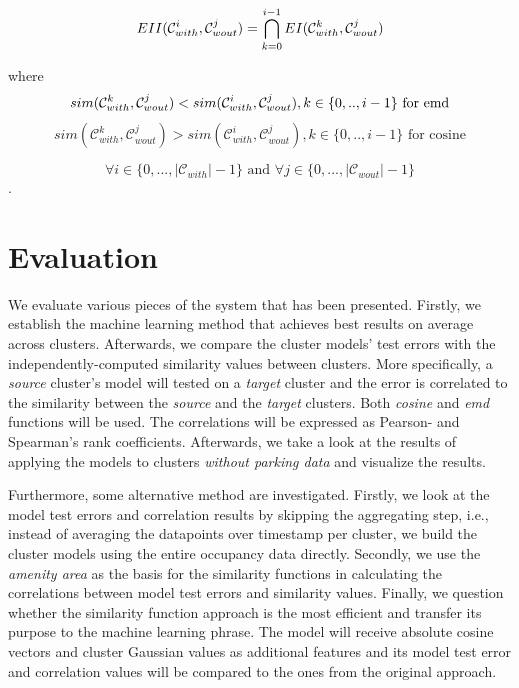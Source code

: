 	\begin{equation}
	EII(\mathcal{C}_{with}^i,\mathcal{C}_{wout}^j) = \bigcap_{k=0}^{i-1} EI(\mathcal{C}_{with}^k,\mathcal{C}_{wout}^j) \\
	\end{equation}
	
	where
	\begin{equation}
	sim(\mathcal{C}_{with}^k,\mathcal{C}_{wout}^j) < sim(\mathcal{C}_{with}^i,\mathcal{C}_{wout}^j), k \in \{0,..,i - 1\} \text{ for emd}\\
	\end{equation}
	\begin{equation}
	sim(\mathcal{C}_{with}^k,\mathcal{C}_{wout}^j) > sim(\mathcal{C}_{with}^i,\mathcal{C}_{wout}^j), k \in \{0,..,i - 1\} \text{ for cosine} 
	\end{equation}
	
	$$\forall i \in \{0,...,|\mathcal{C}_{with}|-1\} \text{ and } \forall j \in \{0,...,|\mathcal{C}_{wout}|-1\}$$.
		
	\section{Evaluation}
	We evaluate various pieces of the system that has been presented. Firstly, we  establish the machine learning method that achieves best results on average across clusters. Afterwards, we compare the cluster models' test errors with the independently-computed similarity values between clusters. More specifically, a \textit{source} cluster's model will tested on a \textit{target} cluster and the error is correlated to the similarity between the \textit{source} and the \textit{target} clusters. Both \textit{cosine} and \textit{emd} functions will be used. The correlations will be expressed as Pearson- and Spearman's rank coefficients. Afterwards, we take a look at the results of applying the models to clusters \textit{without parking data} and visualize the results. 
	
	Furthermore, some alternative method are investigated. Firstly, we look at the model test errors and correlation results by skipping the aggregating step, i.e., instead of averaging the datapoints over timestamp per cluster, we build the cluster models using the entire occupancy data directly. Secondly, we use the \textit{amenity area} as the basis for the similarity functions in calculating the correlations between model test errors and similarity values. Finally, we question whether the similarity function approach is the most efficient and transfer its purpose to the machine learning phrase. The model will receive absolute cosine vectors and cluster Gaussian values as additional features and its model test error and correlation values will be compared to the ones from the original approach.
	
